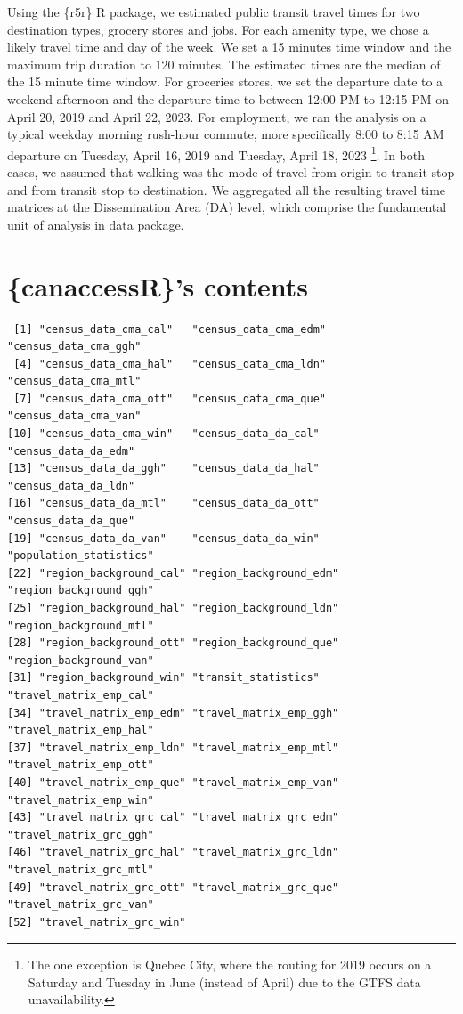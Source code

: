 \documentclass[Royal,times,sageh]{sagej}
\begin{document}
Using the \{r5r\} R package, we estimated public transit travel times
for two destination types, grocery stores and jobs. For each amenity
type, we chose a likely travel time and day of the week. We set a 15
minutes time window and the maximum trip duration to 120 minutes. The
estimated times are the median of the 15 minute time window. For
groceries stores, we set the departure date to a weekend afternoon and
the departure time to between 12:00 PM to 12:15 PM on April 20, 2019 and
April 22, 2023. For employment, we ran the analysis on a typical weekday
morning rush-hour commute, more specifically 8:00 to 8:15 AM departure
on Tuesday, April 16, 2019 and Tuesday, April 18, 2023 \footnote{The one
  exception is Quebec City, where the routing for 2019 occurs on a
  Saturday and Tuesday in June (instead of April) due to the GTFS data
  unavailability.}. In both cases, we assumed that walking was the mode
of travel from origin to transit stop and from transit stop to
destination. We aggregated all the resulting travel time matrices at the
Dissemination Area (DA) level, which comprise the fundamental unit of
analysis in data package.

\section{\{canaccessR\}'s contents}\label{canaccessrs-contents}

\begin{verbatim}
 [1] "census_data_cma_cal"   "census_data_cma_edm"   "census_data_cma_ggh"  
 [4] "census_data_cma_hal"   "census_data_cma_ldn"   "census_data_cma_mtl"  
 [7] "census_data_cma_ott"   "census_data_cma_que"   "census_data_cma_van"  
[10] "census_data_cma_win"   "census_data_da_cal"    "census_data_da_edm"   
[13] "census_data_da_ggh"    "census_data_da_hal"    "census_data_da_ldn"   
[16] "census_data_da_mtl"    "census_data_da_ott"    "census_data_da_que"   
[19] "census_data_da_van"    "census_data_da_win"    "population_statistics"
[22] "region_background_cal" "region_background_edm" "region_background_ggh"
[25] "region_background_hal" "region_background_ldn" "region_background_mtl"
[28] "region_background_ott" "region_background_que" "region_background_van"
[31] "region_background_win" "transit_statistics"    "travel_matrix_emp_cal"
[34] "travel_matrix_emp_edm" "travel_matrix_emp_ggh" "travel_matrix_emp_hal"
[37] "travel_matrix_emp_ldn" "travel_matrix_emp_mtl" "travel_matrix_emp_ott"
[40] "travel_matrix_emp_que" "travel_matrix_emp_van" "travel_matrix_emp_win"
[43] "travel_matrix_grc_cal" "travel_matrix_grc_edm" "travel_matrix_grc_ggh"
[46] "travel_matrix_grc_hal" "travel_matrix_grc_ldn" "travel_matrix_grc_mtl"
[49] "travel_matrix_grc_ott" "travel_matrix_grc_que" "travel_matrix_grc_van"
[52] "travel_matrix_grc_win"
\end{verbatim}
\end{document}
